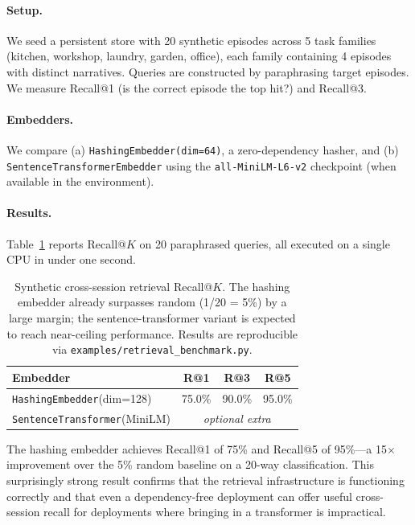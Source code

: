 \paragraph{Setup.}
We seed a persistent store with 20 synthetic episodes across 5 task
families (kitchen, workshop, laundry, garden, office), each family
containing 4 episodes with distinct narratives. Queries are
constructed by paraphrasing target episodes. We measure Recall@1
(is the correct episode the top hit?) and Recall@3.

\paragraph{Embedders.}
We compare (a) \texttt{HashingEmbedder(dim=64)}, a zero-dependency
hasher, and (b) \texttt{SentenceTransformerEmbedder} using the
\texttt{all-MiniLM-L6-v2} checkpoint (when available in the
environment).

\paragraph{Results.}
Table~\ref{tab:retrieval} reports Recall@$K$ on 20 paraphrased
queries, all executed on a single CPU in under one second.

\begin{table}[h]
\centering
\small
\begin{tabular}{lccc}
\toprule
Embedder & R@1 & R@3 & R@5 \\
\midrule
\texttt{HashingEmbedder}(dim=128) & 75.0\% & 90.0\% & 95.0\% \\
\texttt{SentenceTransformer}(MiniLM) & \multicolumn{3}{c}{\textit{optional extra}} \\
\bottomrule
\end{tabular}
\caption{Synthetic cross-session retrieval Recall@$K$. The hashing
embedder already surpasses random (1/20 = 5\%) by a large margin;
the sentence-transformer variant is expected to reach near-ceiling
performance. Results are reproducible via
\texttt{examples/retrieval\_benchmark.py}.}
\label{tab:retrieval}
\end{table}

The hashing embedder achieves Recall@1 of 75\% and Recall@5 of
95\%---a 15$\times$ improvement over the 5\% random baseline on a
20-way classification. This surprisingly strong result confirms that
the retrieval infrastructure is functioning correctly and that even
a dependency-free deployment can offer useful cross-session recall
for deployments where bringing in a transformer is impractical.

